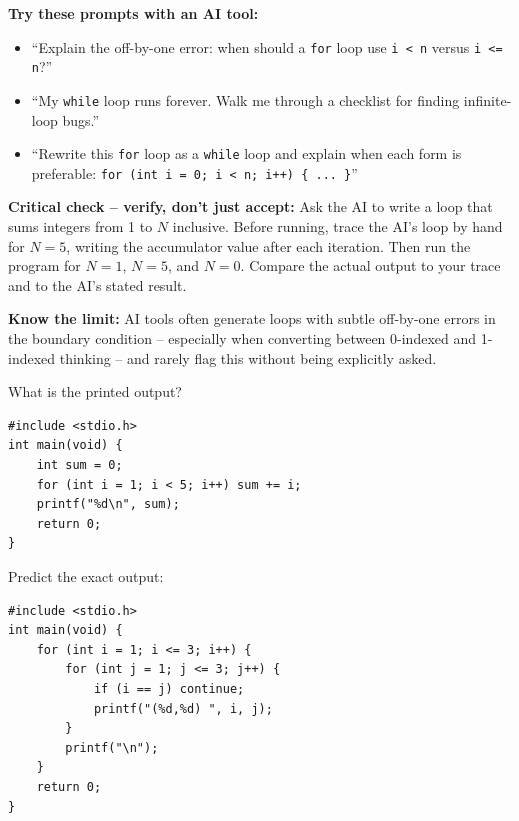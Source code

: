 \documentclass[11pt]{article}
\begin{document}
\begin{aicollab}
\textbf{Try these prompts with an AI tool:}
\begin{itemize}[leftmargin=*,nosep]
  \item ``Explain the off-by-one error: when should a \texttt{for} loop use
        \texttt{i < n} versus \texttt{i <= n}?''
  \item ``My \texttt{while} loop runs forever. Walk me through a checklist for finding
        infinite-loop bugs.''
  \item ``Rewrite this \texttt{for} loop as a \texttt{while} loop and explain when each
        form is preferable:
        \texttt{for (int i = 0; i < n; i++) \{ ... \}}''
\end{itemize}

\medskip\textbf{Critical check -- verify, don't just accept:}
Ask the AI to write a loop that sums integers from 1 to $N$ inclusive.
Before running, trace the AI's loop by hand for $N = 5$, writing the accumulator value
after each iteration. Then run the program for $N = 1$, $N = 5$, and $N = 0$.
Compare the actual output to your trace and to the AI's stated result.

\medskip\textbf{Know the limit:}
AI tools often generate loops with subtle off-by-one errors in the boundary condition --
especially when converting between 0-indexed and 1-indexed thinking -- and rarely flag
this without being explicitly asked.
\end{aicollab}

\takehomebanner

\begin{trace}
What is the printed output?
\begin{lstlisting}
#include <stdio.h>
int main(void) {
    int sum = 0;
    for (int i = 1; i < 5; i++) sum += i;
    printf("%d\n", sum);
    return 0;
}
\end{lstlisting}
\end{trace}

\begin{trace}
Predict the exact output:
\begin{lstlisting}
#include <stdio.h>
int main(void) {
    for (int i = 1; i <= 3; i++) {
        for (int j = 1; j <= 3; j++) {
            if (i == j) continue;
            printf("(%d,%d) ", i, j);
        }
        printf("\n");
    }
    return 0;
}
\end{lstlisting}
\end{trace}
\end{document}
